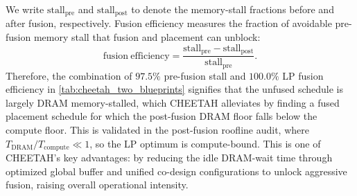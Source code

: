 We write \(\text{stall}_{\text{pre}}\) and \(\text{stall}_{\text{post}}\) to denote the memory-stall fractions before and after fusion, respectively. 
Fusion efficiency measures the fraction of avoidable pre-fusion memory
stall that fusion and placement can unblock:
\[
\mathrm{fusion\ efficiency}
=
\frac{
\mathrm{stall}_{\mathrm{pre}}-\mathrm{stall}_{\mathrm{post}}
}{
\mathrm{stall}_{\mathrm{pre}}
}.
\]
Therefore, the combination of \(97.5\%\) pre-fusion stall and
\(100.0\%\) LP fusion efficiency in \cref{tab:cheetah_two_blueprints}
signifies that the unfused schedule is largely DRAM memory-stalled, which
CHEETAH alleviates by finding a fused placement schedule for which the post-fusion
DRAM floor falls below the compute floor. This is validated in the
post-fusion roofline audit, where
\(T_{\mathrm{DRAM}}/T_{\mathrm{compute}}\ll1\), so the LP optimum is
compute-bound. This is one of CHEETAH's key advantages: by reducing the idle DRAM-wait time through optimized global buffer and unified co-design configurations to unlock aggressive fusion, raising overall operational intensity.






